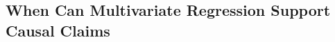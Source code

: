 \subsection{When Can Multivariate Regression Support Causal Claims}
\label{sec:when-can-regression}

